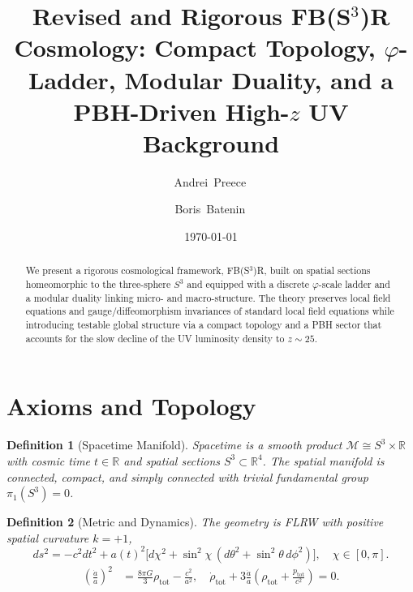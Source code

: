 \documentclass[aps,prd,reprint,onecolumn,nofootinbib]{revtex4-2}
\newtheorem{definition}{Definition}
\begin{document}
\title{Revised and Rigorous FB(S$^3$)R Cosmology: Compact Topology, $\varphi$-Ladder, Modular Duality, and a PBH-Driven High-$z$ UV Background}
\author{Andrei~Preece\,}%

\author{Boris~Batenin\,}%
\date{\today}
\begin{abstract}
We present a rigorous cosmological framework, FB(S$^3$)R, built on spatial sections homeomorphic to the three-sphere $S^3$ and equipped with a discrete $\varphi$-scale ladder and a modular duality linking micro- and macro-structure. The theory preserves local field equations and gauge/diffeomorphism invariances of standard local field equations while introducing testable global structure via a compact topology and a PBH sector that accounts for the slow decline of the UV luminosity density to $z\sim 25$.
\end{abstract}
\maketitle

\section{Axioms and Topology}
\begin{definition}[Spacetime Manifold]
Spacetime is a smooth product $\mathcal M \cong S^3 \times \mathbb R$ with cosmic time $t\in\mathbb R$ and spatial sections $S^3\subset\mathbb R^4$. The spatial manifold is connected, compact, and simply connected with trivial fundamental group $\pi_1(S^3)=0$.
\end{definition}
\begin{definition}[Metric and Dynamics]
The geometry is FLRW with positive spatial curvature $k=+1$,
\begin{equation}
ds^2 = -c^2 dt^2 + a(t)^2\Big[d\chi^2+\sin^2\chi\,(d\theta^2+\sin^2\theta\,d\phi^2)\Big],\quad \chi\in[0,\pi].
\end{equation}
\begin{align}
\left( \frac{\dot{a}}{a} \right)^2 &= \frac{8\pi G}{3} \rho_\text{tot} - \frac{c^2}{a^2},\quad
\dot{\rho}_\text{tot} + 3 \frac{\dot{a}}{a} \left( \rho_\text{tot} + \frac{p_\text{tot}}{c^2} \right) = 0.
\end{align}
\end{definition}
\end{document}
